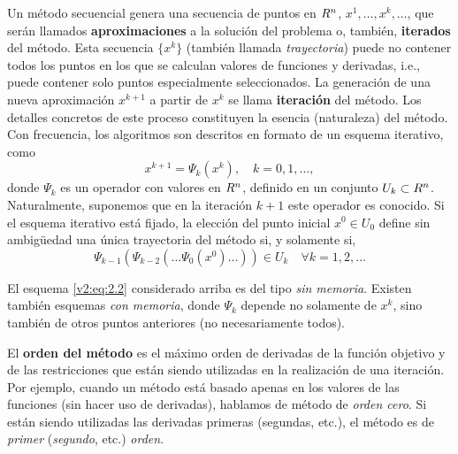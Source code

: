 Un método secuencial genera una secuencia de puntos en $R^n$, $x^1, \dots, x^k, \dots$, que serán llamados \textbf{aproximaciones} a la solución del problema o, también, \textbf{iterados} del método. Esta secuencia $\{x^k\}$ (también llamada \textit{trayectoria}) puede no contener todos los puntos en los que se calculan valores de funciones y derivadas, i.e., puede contener solo puntos especialmente seleccionados. La generación de una nueva aproximación $x^{k+1}$ a partir de $x^k$ se llama \textbf{iteración} del método. Los detalles concretos de este proceso constituyen la esencia (naturaleza) del método. Con frecuencia, los algoritmos son descritos en formato de un esquema iterativo, como
\begin{equation}
    x^{k+1} = \Psi_k(x^k), \quad k = 0, 1, \dots,
    \label{v2:eq:2.2}
\end{equation}
donde $\Psi_k$ es un operador con valores en $R^n$, definido en un conjunto $U_k \subset R^n$. Naturalmente, suponemos que en la iteración $k+1$ este operador es conocido. Si el esquema iterativo está fijado, la elección del punto inicial $x^0 \in U_0$ define sin ambigüedad una única trayectoria del método si, y solamente si,
\[
    \Psi_{k-1}(\Psi_{k-2}(\dots \Psi_0(x^0)\dots)) \in U_k \quad \forall k = 1, 2, \dots
\]

El esquema \eqref{v2:eq:2.2} considerado arriba es del tipo \textit{sin memoria}. Existen también esquemas \textit{con memoria}, donde $\Psi_k$ depende no solamente de $x^k$, sino también de otros puntos anteriores (no necesariamente todos).

El \textbf{orden del método} es el máximo orden de derivadas de la función objetivo y de las restricciones que están siendo utilizadas en la realización de una iteración. Por ejemplo, cuando un método está basado apenas en los valores de las funciones (sin hacer uso de derivadas), hablamos de método de \textit{orden cero}. Si están siendo utilizadas las derivadas primeras (segundas, etc.), el método es de \textit{primer} (\textit{segundo}, etc.) \textit{orden}.

